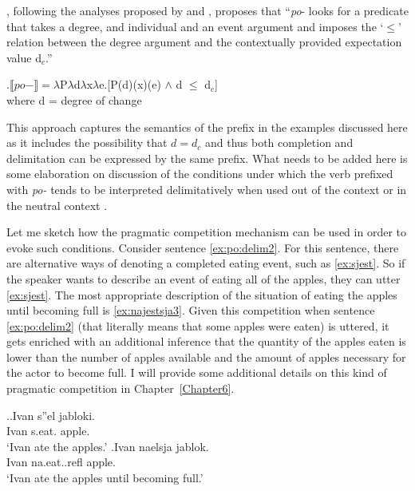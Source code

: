 \citet[48]{Kagan:book}, following the analyses proposed by \citet{Filip:00} and \citet{Souchkova:04}, proposes that ``\textit{po}- looks for a predicate that takes a degree, and individual and an event argument and imposes the `$\leqslant$' relation between the degree argument and the contextually provided   expectation value d$_c$.''

\ex.\label{Kagan:po}$\llbracket po- \rrbracket = \lambda$P$\lambda$d$\lambda$x$\lambda$e.[P(d)(x)(e) $\wedge$ d $\leqslant$ d$_c$]\\
where d = degree of change \citep{KennedyLevin:02}

This approach captures the semantics of the prefix in the examples discussed here as it includes the possibility that $d = d_c$ and thus both completion and delimitation can be expressed by the same prefix. What needs to be added here is some elaboration on discussion of the conditions under which the verb prefixed with \textit{po-}   tends to be interpreted delimitatively when used out of the context   or in the neutral context  .

Let me sketch how the pragmatic competition mechanism can be used in order to evoke such conditions. Consider sentence \ref{ex:po:delim2}. For this sentence, there are alternative ways of denoting a completed eating event, such as \ref{ex:sjest}. So if the speaker wants to describe an event of eating all of the apples, they can utter \ref{ex:sjest}. The most appropriate description of the situation of eating the apples until becoming full is \ref{ex:najestsja3}. Given this competition when sentence \ref{ex:po:delim2} (that literally means that some apples were eaten) is uttered, it gets enriched with an additional inference that the quantity of the apples eaten is lower than the number of apples available and the amount of apples necessary for the actor to become full. I will provide some additional details on this kind of pragmatic competition in Chapter~\ref{Chapter6}.

\ex.\ag.\label{ex:sjest}Ivan s''el jabloki.\\
Ivan s.eat. apple.\\
\trans `Ivan ate the apples.'
\bg.\label{ex:najestsja3}Ivan naelsja jablok.\\
Ivan na.eat..refl apple.\\
\trans `Ivan ate the apples until becoming full.'

